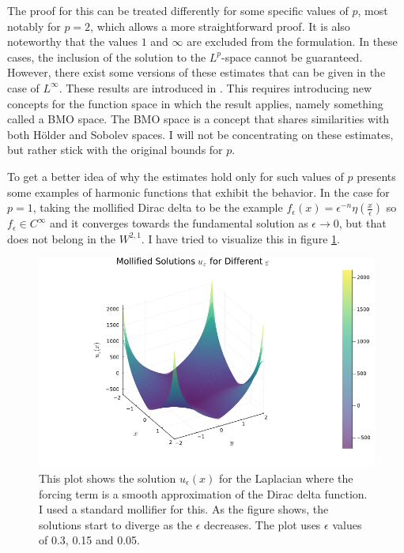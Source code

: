 \documentclass[12pt]{artikel1}
\begin{document}
\noindent The proof for this can be treated differently for some specific values of $p$, most notably for $p=2$, which allows a more straightforward proof. It is also noteworthy that the values $1$ and $\infty$ are excluded from the formulation. In these cases, the inclusion of the solution to the $L^p$-space cannot be guaranteed. However, there exist some versions of these estimates that can be given in the case of $L^\infty$. These results are introduced in \cite{sanpera}. This requires introducing new concepts for the function space in which the result applies, namely something called a BMO space. The BMO space is a concept that shares similarities with both Hölder and Sobolev spaces. I will not be concentrating on these estimates, but rather stick with the original bounds for $p$.

To get a better idea of why the estimates hold only for such values of $p$ \cite{Fern_ndez_Real_2022} presents some examples of harmonic functions that exhibit the behavior. In the case for $p=1$, taking the mollified Dirac delta to be the example $f_\epsilon(x)=\epsilon^{-n}\eta(\frac{x}{\epsilon})$ so $f_\epsilon\in C^{\infty}$ and it converges towards the fundamental solution as $\epsilon\rightarrow0$, but that does not belong in the $W^{2,1}$. I have tried to visualize this in figure \ref{fig:failure}.

\begin{figure}[h]
    \centering
    \includegraphics[width=\textwidth]{Laplacian.png}
    \caption{This plot shows the solution $u_\epsilon(x)$ for the Laplacian where the forcing term is a smooth approximation of the Dirac delta function. I used a standard mollifier for this. As the figure shows, the solutions start to diverge as the $\epsilon$ decreases. The plot uses $\epsilon$ values of 0.3, 0.15 and 0.05.}
    \label{fig:failure}
\end{figure}
\end{document}
